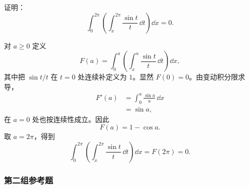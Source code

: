 \begin{xreferenceproblem}[25]
证明：
\[
  \int_0^{2\pi}\left(\int_x^{2\pi}\frac{\sin t}{t}\,\dd t\right)\dd x=0.
\]
\end{xreferenceproblem}
\begin{xsolution}
对 $a\geqslant0$ 定义
\[
  F(a)=\int_0^a\left(\int_x^a\frac{\sin t}{t}\,\dd t\right)\dd x,
\]
其中把 $\sin t/t$ 在 $t=0$ 处连续补定义为 $1$。显然 $F(0)=0$。由变动积分限求导，
\begin{align*}
  F'(a)
  &=\int_0^a\frac{\sin a}{a}\,\dd x\\
  &=\sin a,
\end{align*}
在 $a=0$ 处也按连续性成立。因此
\[
  F(a)=1-\cos a.
\]
取 $a=2\pi$，得到
\[
  \boxed{\int_0^{2\pi}\left(\int_x^{2\pi}\frac{\sin t}{t}\,\dd t\right)\dd x
  =F(2\pi)=0}.
\]
\end{xsolution}


\subsubsection*{第二组参考题}

